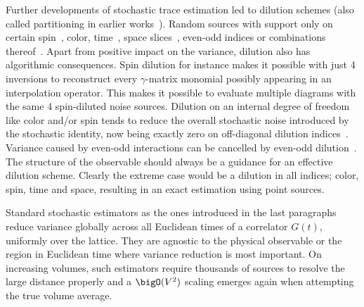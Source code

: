 Further developments of stochastic trace estimation led to dilution schemes (also called partitioning in earlier works~\cite{Wilcox:1999ab}).
Random sources with support only on certain spin~\cite{Wilcox:1997rm,Alexandrou:2010jr}, color, time~\cite{GUSKEN1989,OCais:2004xgm,Bali:2014pva}, space slices~\cite{Foley:2005ac}, even-odd indices or combinations thereof~\cite{Morningstar:2008mc,Bulava:2008qx,Foley:2010vv,Morningstar:2008ph}.
Apart from positive impact on the variance, dilution also has algorithmic consequences.
Spin dilution for instance makes it possible with just \num{4} inversions to reconstruct every $\gamma$-matrix monomial possibly appearing in an interpolation operator.
This makes it possible to evaluate multiple diagrams with the same \num{4} spin-diluted noise sources.
Dilution on an internal degree of freedom like color and/or spin tends to reduce the overall stochastic noise introduced by the stochastic identity, now being exactly zero on off-diagonal dilution indices~\cite{Babich:2010at,Morningstar:2011ka}.
Variance caused by even-odd interactions can be cancelled by even-odd dilution~\cite{Bali_2009,Foley:2005ac,Morningstar:2011ka}.
The structure of the observable should always be a guidance for an effective dilution scheme.
Clearly the extreme case would be a dilution in all indices; color, spin, time and space, resulting in an exact estimation using point sources.%

Standard stochastic estimators as the ones introduced in the last paragraphs reduce variance globally across all Euclidean times of a correlator $G(t)$, \ie uniformly over the lattice.
They are agnostic to the physical observable or the region in Euclidean time where variance reduction is most important.
On increasing volumes, such estimators require thousands of sources to resolve the large distance properly and a $\bigO(V^{2})$ scaling emerges again when attempting the true volume average.


